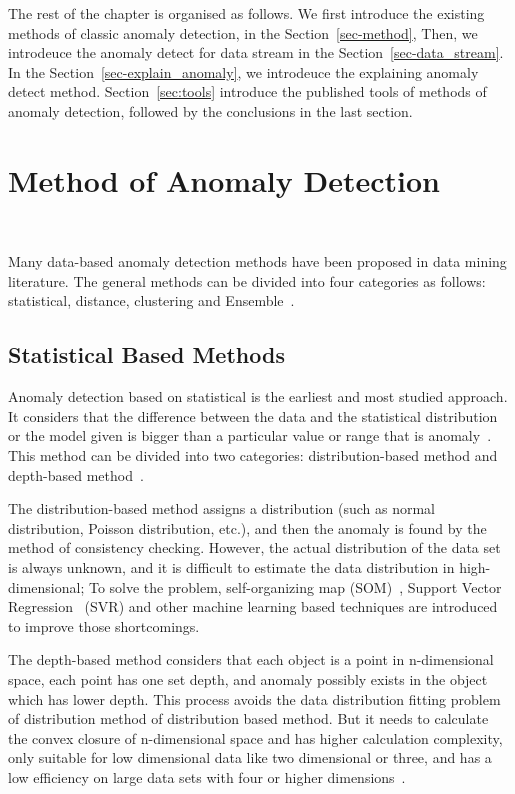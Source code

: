 The rest of the chapter is organised as follows.
We first introduce the existing methods of classic anomaly detection,
in the Section~\ref{sec-method},
Then,
we introdeuce the anomaly detect for data stream
in the Section~\ref{sec-data_stream}.
In the Section~\ref{sec-explain_anomaly},
we introdeuce the explaining anomaly detect method.
Section~\ref{sec:tools} introduce the published tools of
methods of anomaly detection,
followed by the conclusions in the last section.

\section{Method of Anomaly Detection}~\label{sec-method}

Many data-based anomaly detection methods have been proposed in
data mining literature.
The general methods can be divided into four categories as follows: 
statistical, 
distance, 
clustering and Ensemble~\cite{cook2019anomaly}.

\subsection{Statistical Based Methods}

Anomaly detection based on statistical is the earliest and
most studied approach.
It considers that the difference
between the data and the statistical distribution or the model
given is bigger than a particular value or range that is
anomaly~\cite{chandola2009anomaly}.
This method can be divided into two
categories: distribution-based method and depth-based
method~\cite{wu2016survey}.

The distribution-based method assigns a distribution (such as
normal distribution,
Poisson distribution,
etc.),
and then the anomaly is found by the method of consistency checking.
However,
the actual distribution of the data set is always unknown,
and it is difficult to
estimate the data distribution in high-dimensional;
To solve the problem, 
self-organizing map (SOM)~\cite{siripanadorn2010anomaly}, 
Support Vector Regression~\cite{kromanis2013support} (SVR) and
other machine learning based techniques are introduced to
improve those shortcomings.

The depth-based method considers that
each object is a point in n-dimensional space,
each point has one set depth,
and anomaly possibly exists in the object which has lower depth.
This process avoids the data distribution fitting problem of
distribution method of distribution based method.
But it needs to calculate
the convex closure of n-dimensional space and has higher
calculation complexity,
only suitable for low dimensional
data like two dimensional or three,
and has a low efficiency
on large data sets with four or higher dimensions~\cite{ruts1996computing}.


